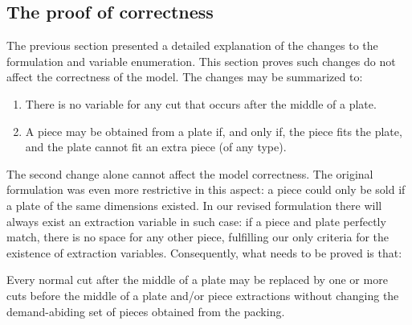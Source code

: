 \documentclass[runningheads]{llncs}
\begin{document}
\subsection{The proof of correctness}

The previous section presented a detailed explanation of the changes to the formulation and variable enumeration.
This section proves such changes do not affect the correctness of the model.
The changes may be summarized to:

\begin{enumerate}
\item There is no variable for any cut that occurs after the middle of a plate.
\item A piece may be obtained from a plate if, and only if, the piece fits the plate, and the plate cannot fit an extra piece (of any type).
\end{enumerate}
 
The second change alone cannot affect the model correctness.
The original formulation was even more restrictive in this aspect:
a piece could only be sold if a plate of the same dimensions existed.
In our revised formulation there will always exist an extraction variable in such case:
if a piece and plate perfectly match, there is no space for any other piece, fulfilling our only criteria for the existence of extraction variables.
Consequently, what needs to be proved is that:

\begin{theorem}
Every normal cut after the middle of a plate may be replaced by one or more cuts before the middle of a plate and/or piece extractions without changing the demand-abiding set of pieces obtained from the packing.
\end{theorem}
\end{document}
